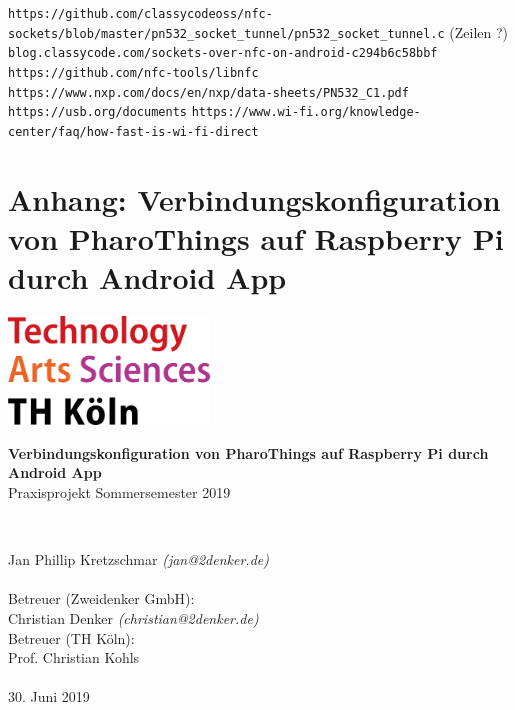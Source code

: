 \begin{thebibliography}{9}
        \texttt{https://github.com/classycodeoss/nfc-sockets/blob/\linebreak master/pn532\_socket\_tunnel/pn532\_socket\_tunnel.c} (Zeilen ?)
        \texttt{blog.classycode.com/sockets-over-nfc-on-\linebreak android-c294b6c58bbf}
        \texttt{https://github.com/nfc-tools/libnfc}
        \texttt{https://www.nxp.com/docs/en/nxp/data-sheets/\linebreak PN532\_C1.pdf}
        \texttt{https://usb.org/documents}
        \texttt{https://www.wi-fi.org/knowledge-center/faq/\linebreak how-fast-is-wi-fi-direct}
    \end{thebibliography}
    \pagebreak
    \appendix
    \stopcontents

    \startcontents[sections]
    \section{Anhang: Verbindungskonfiguration von PharoThings auf Raspberry Pi durch Android App}
    \includegraphics[width=0.4\textwidth]{../latex-ai-project/th_logo.png}
    ~\\[2.5cm]
    \begin{center}
    \textbf{\huge Verbindungskonfiguration von PharoThings auf Raspberry Pi durch Android App}\\[0.5cm]
    {\Large Praxisprojekt Sommersemester 2019}
    \vfill
    \end{center}
    ~\\[2.0cm]
    \begin{flushright}
    {\large Jan Phillip Kretzschmar \it{(jan@2denker.de)}}\\[0.1cm]
    ~\\[1.0cm]
    {\large Betreuer (Zweidenker GmbH):}\\[0.1cm]
    {\large Christian Denker \it{(christian@2denker.de)}}
    ~\\[0.5cm]
    {\large Betreuer (TH Köln):}\\[0.1cm]
    {\large Prof. Christian Kohls}\\[0.1cm]

	~\\[1.0cm]
    {\large 30. Juni 2019}
	\end{flushright}

